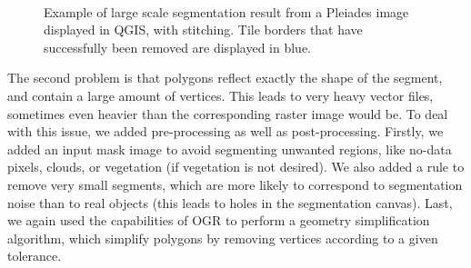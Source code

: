 \documentclass{josis}
\begin{document}
\begin{figure}[!htb]
\centering
{}\\
\caption{Example of large scale segmentation result from a Pleiades
  image displayed in QGIS, with stitching. Tile borders that have
  successfully been removed are displayed in blue.}
\end{figure}

The second problem is that polygons reflect exactly the shape of
the segment, and contain a large amount of vertices. This leads to
very heavy vector files, sometimes even heavier than the corresponding
raster image would be. To deal with this issue, we added
pre-processing as well as post-processing. Firstly, we added an input
mask image to avoid segmenting unwanted regions, like no-data pixels,
clouds, or vegetation (if vegetation is not desired). We also added a
rule to remove very small segments, which are more likely to
correspond to segmentation noise than to real objects (this leads to
holes in the segmentation canvas). Last, we again used the
capabilities of OGR to perform a geometry simplification algorithm,
which simplify polygons by removing vertices according to a given
tolerance.
\end{document}

